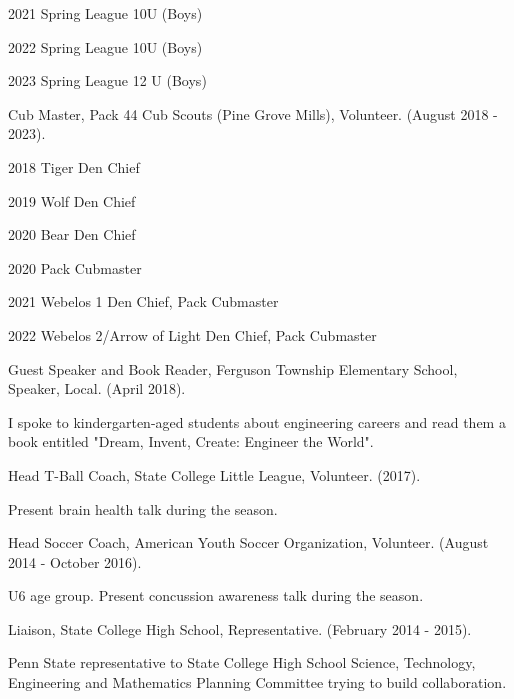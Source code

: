 \documentclass[a4paper,10pt]{article}
\begin{document}
\hspace{1cm}2021 Spring League 10U (Boys)

\hspace{1cm}2022 Spring League 10U (Boys)

\hspace{1cm}2023 Spring League 12 U (Boys)

\hspace{1cm}Cub Master, Pack 44 Cub Scouts (Pine Grove Mills), Volunteer. (August 2018 - 2023).

\hspace{1cm}2018 Tiger Den Chief

\hspace{1cm}2019 Wolf Den Chief

\hspace{1cm}2020 Bear Den Chief

\hspace{1cm}2020 Pack Cubmaster

\hspace{1cm}2021 Webelos 1 Den Chief, Pack Cubmaster

\hspace{1cm}2022 Webelos 2/Arrow of Light Den Chief, Pack Cubmaster

\hspace{1cm}Guest Speaker and Book Reader, Ferguson Township Elementary School, Speaker, Local. (April 2018).

\hspace{1cm}I spoke to kindergarten-aged students about engineering careers and read them a book entitled "Dream, Invent, Create: Engineer the World".

\hspace{1cm}Head T-Ball Coach, State College Little League, Volunteer. (2017).

\hspace{1cm}Present brain health talk during the season.

\hspace{1cm}Head Soccer Coach, American Youth Soccer Organization, Volunteer. (August 2014 - October 2016).

\hspace{1cm}U6 age group.    Present concussion awareness talk during the season.

\hspace{1cm}Liaison, State College High School, Representative. (February 2014 - 2015).

\hspace{1cm}Penn State representative to State College High School Science, Technology, Engineering and Mathematics Planning Committee trying to build collaboration.
\end{document}
